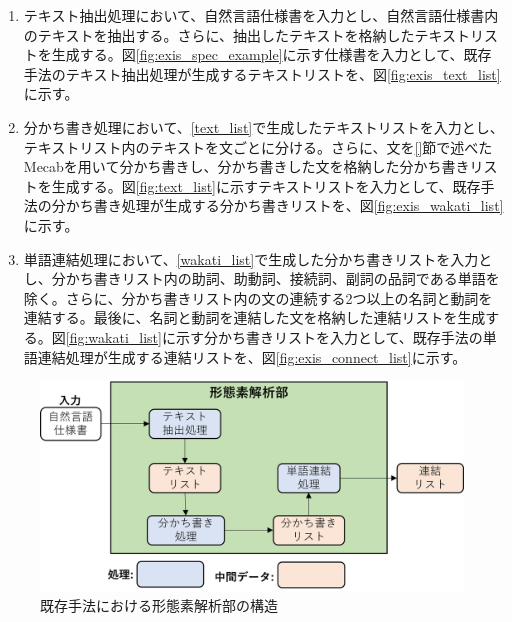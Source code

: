 \begin{enumerate}
    \item テキスト抽出処理において、自然言語仕様書を入力とし、自然言語仕様書内のテキストを抽出する。さらに、抽出したテキストを格納したテキストリストを生成する。図\ref{fig:exis_spec_example}に示す仕様書を入力として、既存手法のテキスト抽出処理が生成するテキストリストを、図\ref{fig:exis_text_list}に示す。
    \label{text_list}
    \item 分かち書き処理において、\ref{text_list}で生成したテキストリストを入力とし、テキストリスト内のテキストを文ごとに分ける。さらに、文を\ref{}節で述べたMecabを用いて分かち書きし、分かち書きした文を格納した分かち書きリストを生成する。図\ref{fig:text_list}に示すテキストリストを入力として、既存手法の分かち書き処理が生成する分かち書きリストを、図\ref{fig:exis_wakati_list}に示す。
    \label{wakati_list}
    \item 単語連結処理において、\ref{wakati_list}で生成した分かち書きリストを入力とし、分かち書きリスト内の助詞、助動詞、接続詞、副詞の品詞である単語を除く。さらに、分かち書きリスト内の文の連続する2つ以上の名詞と動詞を連結する。最後に、名詞と動詞を連結した文を格納した連結リストを生成する。図\ref{fig:wakati_list}に示す分かち書きリストを入力として、既存手法の単語連結処理が生成する連結リストを、図\ref{fig:exis_connect_list}に示す。
\end{enumerate}

\begin{figure}[tp]
    \begin{center}
        \includegraphics[width=1.0\columnwidth]{image/exis_mor_structure.png}
        \caption{既存手法における形態素解析部の構造}
        \label{fig:exis_mor_structure}
    \end{center}
\end{figure}

